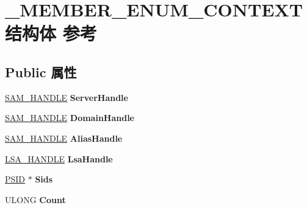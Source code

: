\hypertarget{struct___m_e_m_b_e_r___e_n_u_m___c_o_n_t_e_x_t}{}\section{\+\_\+\+M\+E\+M\+B\+E\+R\+\_\+\+E\+N\+U\+M\+\_\+\+C\+O\+N\+T\+E\+X\+T结构体 参考}
\label{struct___m_e_m_b_e_r___e_n_u_m___c_o_n_t_e_x_t}
\subsection*{Public 属性}
\begin{DoxyCompactItemize}
\item 
\mbox{\label{struct___m_e_m_b_e_r___e_n_u_m___c_o_n_t_e_x_t_a964f0582f91571e1fa41e10b7dad7d7a}} 
\hyperlink{interfacevoid}{S\+A\+M\+\_\+\+H\+A\+N\+D\+LE} {\bfseries Server\+Handle}
\item 
\mbox{\label{struct___m_e_m_b_e_r___e_n_u_m___c_o_n_t_e_x_t_a7a0d11fce1371b5c9803c2bfc9f97f6c}} 
\hyperlink{interfacevoid}{S\+A\+M\+\_\+\+H\+A\+N\+D\+LE} {\bfseries Domain\+Handle}
\item 
\mbox{\label{struct___m_e_m_b_e_r___e_n_u_m___c_o_n_t_e_x_t_ad5c3f59bdfee6316c1627ed26b1a76ab}} 
\hyperlink{interfacevoid}{S\+A\+M\+\_\+\+H\+A\+N\+D\+LE} {\bfseries Alias\+Handle}
\item 
\mbox{\label{struct___m_e_m_b_e_r___e_n_u_m___c_o_n_t_e_x_t_ae14df3651245ed519fbac7079d9ed5a5}} 
\hyperlink{interfacevoid}{L\+S\+A\+\_\+\+H\+A\+N\+D\+LE} {\bfseries Lsa\+Handle}
\item 
\mbox{\label{struct___m_e_m_b_e_r___e_n_u_m___c_o_n_t_e_x_t_afbe2bb282858e406ac91f606d17c32cb}} 
\hyperlink{struct___s_i_d}{P\+S\+ID} $\ast$ {\bfseries Sids}
\item 
\mbox{\label{struct___m_e_m_b_e_r___e_n_u_m___c_o_n_t_e_x_t_affc3923a49ce94d7f87dc1e825bd0336}} 
U\+L\+O\+NG {\bfseries Count}

\end{DoxyCompactItemize}
